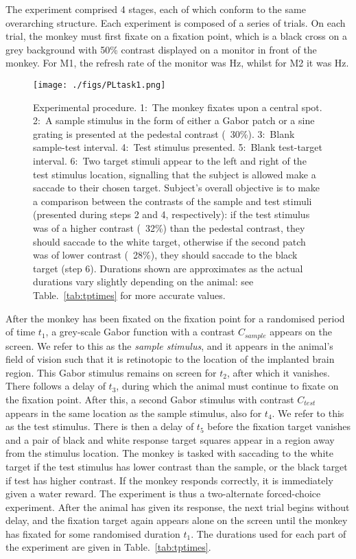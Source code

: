 The experiment comprised 4 stages, each of which conform to the same overarching structure.
Each experiment is composed of a series of trials. On each trial, the monkey must first fixate on a fixation point, which is a black cross on a grey background with 50\% contrast displayed on a monitor in front of the monkey. For M1, the refresh rate of the monitor was \unit[85]{Hz}, whilst for M2 it was \unit[75]{Hz}.

\begin{figure}[htbp]
\begin{center}
\texttt{[image: ./figs/PLtask1.png]}
\end{center}
\caption{
Experimental procedure.
1:~The monkey fixates upon a central spot. 2:~A sample stimulus in the form of either a Gabor patch or a sine grating is presented at the pedestal contrast (\eg{}~30\%). 3:~Blank sample-test interval. 4:~Test stimulus presented. 5:~Blank test-target interval. 6:~Two target stimuli appear to the left and right of the test stimulus location, signalling that the subject is allowed make a saccade to their chosen target.
Subject's overall objective is to make a comparison between the contrasts of the sample and test stimuli (presented during steps 2 and 4, respectively): if the test stimulus was of a higher contrast (\eg{}~32\%) than the pedestal contrast, they should saccade to the white target, otherwise if the second patch was of lower contrast (\eg{}~28\%), they should saccade to the black target (step 6).
Durations shown are approximates as the actual durations vary slightly depending on the animal: see Table.~\ref{tab:tptimes} for more accurate values.}
\label{fig:pltask1}
\end{figure}

After the monkey has been fixated on the fixation point for a randomised period of time
$t_1$,
a grey-scale Gabor function with a contrast $C_{sample}$ appears on the screen. We refer to this as the \textit{sample stimulus}, and it appears in the animal's field of vision such that it is retinotopic to the location of the implanted brain region.
This Gabor stimulus remains on screen for $t_2$, after which it vanishes.
There follows a delay of $t_3$, during which the animal must continue to fixate on the fixation point.
After this, a second Gabor stimulus with contrast $C_{test}$ appears in the same location as the sample stimulus, also for $t_4$. We refer to this as the test stimulus.
There is then a delay of $t_5$ before the fixation target vanishes and a pair of black and white response target squares appear in a region away from the stimulus location. The monkey is tasked with saccading to the white target if the test stimulus has lower contrast than the sample, or the black target if test has higher contrast. If the monkey responds correctly, it is immediately given a water reward. The experiment is thus a two-alternate forced-choice experiment.
After the animal has given its response, the next trial begins without delay, and the fixation target again appears alone on the screen until the monkey has fixated for some randomised duration $t_1$.
The durations used for each part of the experiment are given in Table.~\ref{tab:tptimes}.

